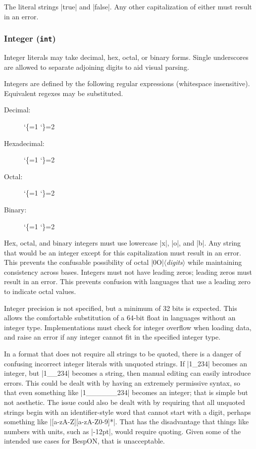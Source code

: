 \documentclass[11pt]{article}
\makeatletter
\newcommand{\bespon}{BespON}
\newcommand{\vmeta}[1]{{\color{DarkRed}\ensuremath{\langle}\textit{#1}\ensuremath{\rangle}}}
\newcommand{\lit}{%
  \begingroup
  \let\do\@makeother
  \dospecials
  \catcode`\{=1
  \catcode`\}=2
  \lit@i}
\def\lit@i#1{%
  \endgroup
  \texttt{\color{DarkRed}\detokenize{#1}}}
\makeatother
\begin{document}
The literal strings |true| and |false|.  Any other capitalization of either must result in an error.


\subsubsection{Integer (\texttt{int})}

Integer literals may take decimal, hex, octal, or binary forms.  Single underscores are allowed to separate adjoining digits to aid visual parsing.

Integers are defined by the following regular expressions (whitespace insensitive).  Equivalent regexes may be substituted.
\begin{description}
\item[Decimal:]  \lit{[+-]?[\x20\t]*(?: 0 | [1-9](?:_[0-9]|[0-9])*) $}
\item[Hexadecimal:]  \lit{[+-]?[\x20\t]*0x[0-9a-fA-F](?:_[0-9a-fA-F]|[0-9a-fA-F])*$}
\item[Octal:]  \lit{[+-]?[\x20\t]*0o[0-7](?:_[0-7]|[0-7])*$}
\item[Binary:]  \lit{[+-]?[\x20\t]*0b[01](?:_[01]|[01])*$}
\end{description} %
Hex, octal, and binary integers must use lowercase |x|, |o|, and |b|.  Any string that would be an integer except for this capitalization must result in an error.  This prevents the confusable possibility of octal |0O|\vmeta{digits} while maintaining consistency across bases.  Integers must not have leading zeros; leading zeros must result in an error.  This prevents confusion with languages that use a leading zero to indicate octal values.

Integer precision is not specified, but a minimum of 32 bits is expected.  This allows the comfortable substitution of a 64-bit float in languages without an integer type.  Implementations must check for integer overflow when loading data, and raise an error if any integer cannot fit in the specified integer type.

In a format that does not require all strings to be quoted, there is a danger of confusing incorrect integer literals with unquoted strings.  If |1_234| becomes an integer, but |1__234| becomes a string, then manual editing can easily introduce errors.  This could be dealt with by having an extremely permissive syntax, so that even something like |1______234| becomes an integer; that is simple but not aesthetic.  The issue could also be dealt with by requiring that all unquoted strings begin with an identifier-style word that cannot start with a digit, perhaps something like |[a-zA-Z][a-zA-Z0-9]*|.  That has the disadvantage that things like numbers with units, such as |-12pt|, would require quoting.  Given some of the intended use cases for \bespon, that is unacceptable.
\end{document}

